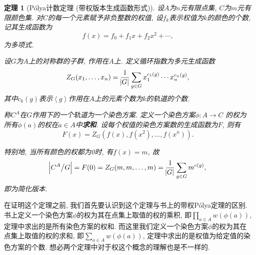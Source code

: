 \documentclass[chinese]{assignment}[2019/10/15]
\newcommand{\lr}[3]{\left#1#3\right#2}
\theoremstyle{plain}
\newtheorem{theorem}{定理}[section]
\newcommand{\Polya}{P\'{o}lya}
\begin{document}
    \begin{theorem}[\Polya 计数定理 (带权版本生成函数形式)]
        设$A$为$n$元有限点集, $C$为$m$元有限颜色集. 对$C$的每一个元素赋予非负整数的权值, 设$f_k$表示权值为$k$的颜色的个数, 记其生成函数为
        \begin{equation}
            f(x) = f_0 + f_1x + f_2x^2 + \dotsb,
        \end{equation}
        为多项式.

        设$G$为$A$上的对称群的子群, 作用在$A$上. 定义循环指数为多元生成函数
        \begin{equation}
            Z_G(x_1, \dotsc, x_n) = \frac{1}{\abs{G}}\sum_{g\in G}x_1^{c_1(g)}\dotsb x_n^{c_n(g)},
        \end{equation}
        其中$c_k(g)$表示$\lr<>g$作用在$A$上的元素个数为$k$的轨道的个数.

        称$C^A$在$G$作用下的一个轨道为一个染色方案. 定义一个染色方案$\phi : A\to C$ 的权为所有$\phi(a)$的权在$a\in A$中\textbf{求和}. 设每个权值的染色方案数的生成函数为$F$, 则有
        \begin{equation}
            F(x) = Z_G\left(f(x), f(x^2), \dotsc, f(x^n)\right).
        \end{equation}

        特别地, 当所有颜色的权都为0时, 有$f(x)=m$, 故
        \begin{equation}
            \abs{C^A\big/G} = F(0) = Z_G(m, m, \dotsc, m) = \frac{1}{\abs{G}}\sum_{g\in G}m^{c(g)},
        \end{equation}
        即为简化版本.
    \end{theorem}

    在证明这个定理之前, 我们首先要认识到这个定理与书上的带权\Polya 定理的区别. 书上定义一个染色方案$\phi$的权为其在点集上取值的权的乘积, 即$\prod_{a\in A} w(\phi(a))$, 定理中求出的是所有染色方案的权和. 而这里我们定义一个染色方案$\phi$的权为其在点集上取值的权的求和, 即$\sum_{a\in A} w(\phi(a))$, 定理中求出的是权值为给定值的染色方案的个数. 想必两个定理中对于权这个概念的理解也是不一样的.
\end{document}
